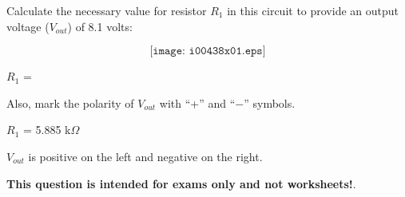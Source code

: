 

Calculate the necessary value for resistor $R_1$ in this circuit to provide an output voltage ($V_{out}$) of 8.1 volts:

$$\texttt{[image: i00438x01.eps]}$$

$R_1$ = 

\vskip 10pt

Also, mark the polarity of $V_{out}$ with ``+'' and ``$-$'' symbols.

\vskip 10pt







$R_1$ = 5.885 k$\Omega$

\vskip 10pt

$V_{out}$ is positive on the left and negative on the right.







{\bf This question is intended for exams only and not worksheets!}.


